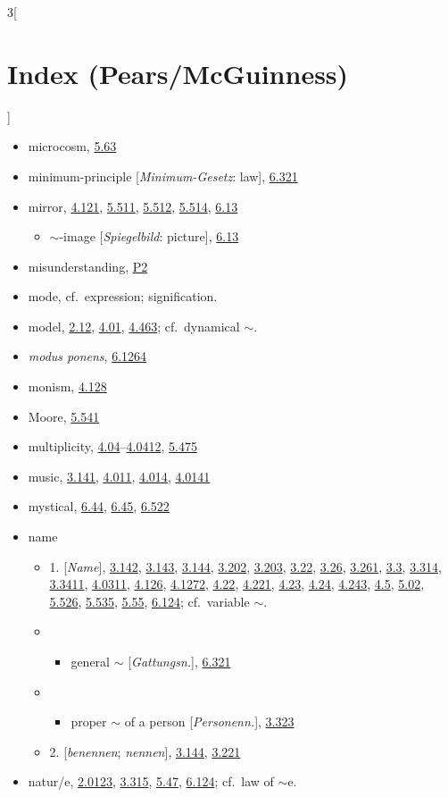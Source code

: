 \documentclass[oneside,openany,12pt]{book}
\newcommand{\indexentry}[1]{\item #1}
\newcommand{\indexsubentry}[1]{\begin{itemize} \item #1 \end{itemize}}
\newcommand{\indexsubsubentry}[1]{\begin{itemize} \item \begin{itemize} \item #1 \end{itemize} \end{itemize}}
\newcommand{\indexref}[1]{\hyperlink{prop#1}{#1}}
\newcommand{\indexgap}{\bigskip}
\begin{document}
\begin{multicols}{3}[\section*{Index (Pears/McGuinness)}]
\begin{itemize}
\indexentry{microcosm, \indexref{5.63}}

\indexentry{minimum-principle [\textit{Minimum-Gesetz}: law], \indexref{6.321}}

\indexentry{mirror, \indexref{4.121}, \indexref{5.511}, \indexref{5.512}, \indexref{5.514}, \indexref{6.13}}

   \indexsubentry{$\sim$-image [\textit{Spiegelbild}: picture], \indexref{6.13}}

\indexentry{misunderstanding, \hyperlink{pref2}{P2}}

\indexentry{mode, cf.\ expression; signification.}

\indexentry{model, \indexref{2.12}, \indexref{4.01}, \indexref{4.463}; cf.\ dynamical $\sim$.}

\indexentry{\textit{modus ponens}, \indexref{6.1264}}

\indexentry{monism, \indexref{4.128}}

\indexentry{Moore, \indexref{5.541}}

\indexentry{multiplicity, \indexref{4.04}--\indexref{4.0412}, \indexref{5.475}}

\indexentry{music, \indexref{3.141}, \indexref{4.011}, \indexref{4.014}, \indexref{4.0141}}

\indexentry{mystical, \indexref{6.44}, \indexref{6.45}, \indexref{6.522}}

\indexgap

\indexentry{name}

   \indexsubentry{1. [\textit{Name}], \indexref{3.142}, \indexref{3.143}, \indexref{3.144}, \indexref{3.202}, \indexref{3.203}, \indexref{3.22}, \indexref{3.26}, \indexref{3.261}, \indexref{3.3}, \indexref{3.314}, \indexref{3.3411}, \indexref{4.0311}, \indexref{4.126}, \indexref{4.1272}, \indexref{4.22}, \indexref{4.221}, \indexref{4.23}, \indexref{4.24}, \indexref{4.243}, \indexref{4.5}, \indexref{5.02}, \indexref{5.526}, \indexref{5.535}, \indexref{5.55}, \indexref{6.124}; cf.\ variable $\sim$.}

   \indexsubsubentry{general $\sim$ [\textit{Gattungsn.}], \indexref{6.321}}

   \indexsubsubentry{proper $\sim$ of a person [\textit{Personenn.}], \indexref{3.323}}

   \indexsubentry{2. [\textit{benennen}; \textit{nennen}], \indexref{3.144}, \indexref{3.221}}

\indexentry{natur/e, \indexref{2.0123}, \indexref{3.315}, \indexref{5.47}, \indexref{6.124}; cf.\ law of $\sim$e.}


\end{itemize}
\end{multicols}
\end{document}
